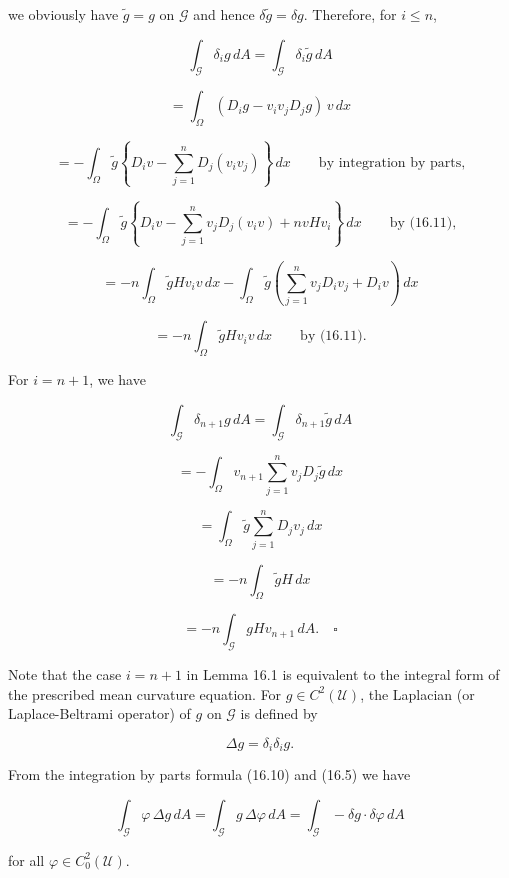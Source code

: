 we obviously have $\tilde g = g$ on $\mathcal{G}$ and hence $\delta \tilde g = \delta g$. Therefore, for $i \le n$,

\[
\int_{\mathcal{G}} \delta_i g\, dA = \int_{\mathcal{G}} \delta_i \tilde g\, dA
\]

\[
= \int_{\Omega} (D_i g - v_i v_j D_j g)\, v\, dx
\]


\setcounter{page}{391}

\[
= - \int_{\Omega} \tilde{g}\left\{D_i v - \sum_{j=1}^n D_j(v_i v_j)\right\}\,dx \qquad \text{by integration by parts,}
\]

\[
= - \int_{\Omega} \tilde{g}\left\{D_i v - \sum_{j=1}^n v_j D_j(v_i v) + n v H v_i\right\}\,dx \qquad \text{by (16.11),}
\]

\[
= - n \int_{\Omega} \tilde{g}Hv_i v\,dx - \int_{\Omega} \tilde{g}\left(\sum_{j=1}^n v_j D_i v_j + D_i v\right)\,dx
\]

\[
= - n \int_{\Omega} \tilde{g}Hv_i v\,dx \qquad \text{by (16.11).}
\]

For $i=n+1$, we have

\[
\int_{\mathcal G}\delta_{n+1}g\,dA=\int_{\mathcal G}\delta_{n+1}\tilde{g}\,dA
\]

\[
= - \int_{\Omega} v_{n+1}\sum_{j=1}^n v_jD_j\tilde{g}\,dx
\]

\[
= \int_{\Omega} \tilde{g}\sum_{j=1}^n D_jv_j\,dx
\]

\[
= - n \int_{\Omega}\tilde{g}H\,dx
\]

\[
= - n \int_{\mathcal G} gH v_{n+1}\,dA.\quad \square
\]

Note that the case $i=n+1$ in Lemma 16.1 is equivalent to the integral form of
the prescribed mean curvature equation.
For $g\in C^2(\mathcal U)$, the Laplacian (or Laplace-Beltrami operator) of $g$ on $\mathcal G$ is defined
by

\begin{equation}
\Delta g=\delta_i\delta_i g.
\tag{16.12}
\end{equation}

From the integration by parts formula (16.10) and (16.5) we have

\begin{equation}
\int_{\mathcal G}\varphi\,\Delta g\,dA=\int_{\mathcal G}g\,\Delta\varphi\,dA=\int_{\mathcal G}-\delta g\cdot\delta\varphi\,dA
\tag{16.13}
\end{equation}

for all $\varphi\in C_0^2(\mathcal U)$.


